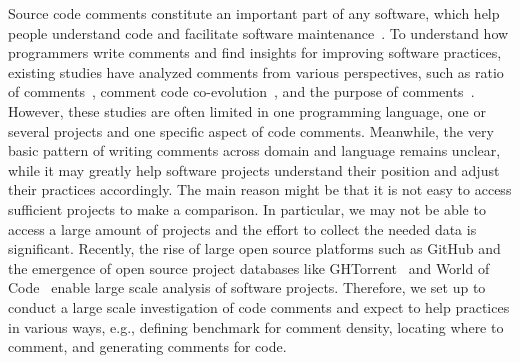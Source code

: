 \documentclass[sigconf,screen]{acmart}
\begin{document}
Source code comments constitute an important part of any software, which help people understand code and facilitate software maintenance~\cite{Woodfield:1981:EMC:800078.802534,Tenny:1988:PRP:51199.51203}.
To understand how programmers write comments and find insights for improving software practices, existing studies have analyzed comments from various perspectives, such as %
ratio of comments~\cite{POman1992ICSM}, comment code co-evolution~\cite{Fluri2009Coevolution}, and the purpose of comments~\cite{2017MSR-ClassifyingJavaComment}. 
However, these studies are often limited in one programming language, one or several projects and one specific aspect of code comments.  
Meanwhile, the very basic pattern of writing comments across domain and language remains unclear, while it may greatly help software projects understand their position and adjust their practices accordingly.
The main reason might be that it is not easy to access sufficient projects to make a comparison. In particular, we may not be able to access a large amount of projects and the effort to collect the needed data is significant.
Recently, the rise of large open source platforms such as GitHub and the emergence of open source project databases like GHTorrent~\cite{2012MSR-GHTorrent} and World of Code~\cite{2019MSR-WorldOfCode} enable large scale analysis of software projects. %
Therefore, we set up to conduct a large scale investigation of code comments and expect to help practices in various ways, e.g., defining benchmark for comment density, locating where to comment, and generating comments for code.

\end{document}
